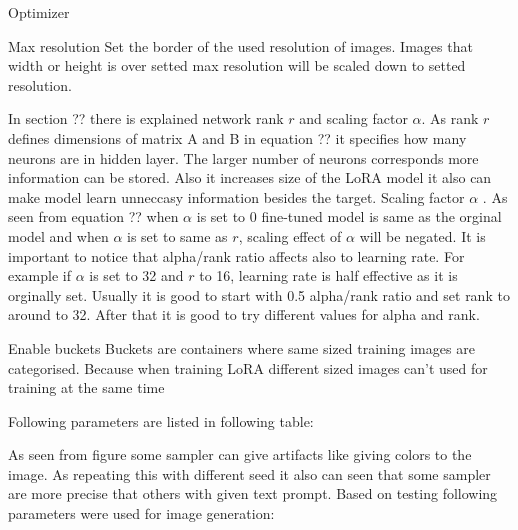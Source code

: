Optimizer

Max resolution
Set the border of the used resolution of images. Images that width or height is over setted max resolution will be scaled down to setted resolution.

In section ?? there is explained network rank $r$ and scaling factor $\alpha$. As rank $r$ defines dimensions of matrix A and B in equation ?? it specifies how many neurons are in hidden layer. The larger number of neurons corresponds more information can be stored. Also it increases size of the LoRA model it also can make model learn unneccasy information besides the target. 
Scaling factor $\alpha$ . As seen from equation ?? when $\alpha$ is set to 0 fine-tuned model is same as the orginal model and when $\alpha$ is set to same as $r$, scaling effect of $\alpha$ will be negated. It is important to notice that alpha/rank ratio affects also to learning rate. For example if $\alpha$ is set to 32 and $r$ to 16, learning rate is half effective as it is orginally set. 
Usually it is good to start with 0.5 alpha/rank ratio and set rank to around to 32. After that it is good to try different values for alpha and rank. 

Enable buckets
Buckets are containers where same sized training images are categorised. Because when training LoRA different sized images can't used for training at the same time

Following parameters are listed in following table:


As seen from figure some sampler can give artifacts like giving colors to the image. As repeating this with different seed it also can seen that some sampler are more precise that others with given text prompt. Based on testing following parameters were used for image generation:




